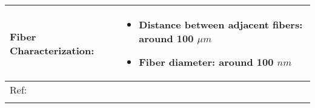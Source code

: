 \begin{table}[th]
\begin{tabular}{
>{\raggedright\arraybackslash}p{}
>{\raggedright\arraybackslash}p{} }
\hline
Fiber Characterization: &
\begin{itemize}[leftmargin=*]
\item Distance between adjacent fibers: around 100 $\mu m$
\item Fiber diameter: around 100 $n m$
\end{itemize} \\

\hline
Ref: & \cite{Camillo2013} \\ %
\arrayrulecolor{black}\hline
\label{tbl:FloresCompare}
\end{tabular}
\end{table}

